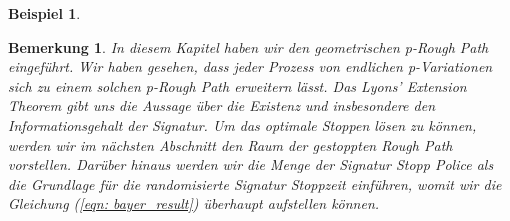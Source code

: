 \documentclass[12pt,titlepage,headsepline]{article}
\newtheorem{beispiel}[definition]{Beispiel}
\newtheorem*{bemerkung*}{Bemerkung}
\begin{document}
\begin{beispiel}
{        %
        }
      \end{beispiel}
      \begin{bemerkung*}
        \textup{
        In diesem Kapitel haben wir den geometrischen p-Rough Path eingeführt. Wir haben gesehen, dass jeder Prozess von endlichen p-Variationen sich zu einem solchen p-Rough Path erweitern lässt. Das Lyons' Extension Theorem gibt uns die Aussage über die Existenz und insbesondere den Informationsgehalt der Signatur. Um das optimale Stoppen lösen zu können, werden wir im nächsten Abschnitt den Raum der gestoppten Rough Path vorstellen. Darüber hinaus werden wir die Menge der Signatur Stopp Police als die Grundlage für die randomisierte Signatur Stoppzeit einführen, womit wir die Gleichung (\ref{eqn: bayer_result}) überhaupt aufstellen können.
        }
      \end{bemerkung*}
      \newpage
\end{document}

